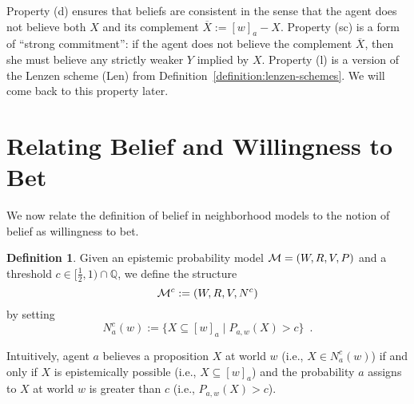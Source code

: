 \documentclass[12pt]{article}
\theoremstyle{definition}
\newtheorem{definition}[theorem]{Definition}
\newcommand{\Rat}{\mathbb{Q}}  %
\newcommand{\M}{{\cal M}}      %
\begin{document}
Property (d) ensures that beliefs are consistent in the sense that the
agent does not believe both $X$ and its complement
$\overline{X}:=[w]_a-X$.  Property (sc) is a form of ``strong
commitment'': if the agent does not believe the complement
$\overline{X}$, then she must believe any strictly weaker $Y$ implied
by $X$.  Property (l) is a version of the Lenzen scheme (Len) from
Definition~\ref{definition:lenzen-schemes}.  We will come back to this
property later.

\section{Relating Belief and Willingness to Bet}
\label{Section:BeliefBet}

We now relate the definition of belief in neighborhood models to the
notion of belief as willingness to bet.

\begin{definition}
  Given an epistemic probability model $\M = (W,R,V,P)$ and
  a threshold $c\in[\frac 12,1)\cap\Rat$, we define the structure
  \[
  \M^c := (W,R,V,N^c)
  \]
  by setting
  \[
  N^c_a(w) := \{X\subseteq[w]_a\mid P_{a,w}(X)>c\}\enspace.
  \]
\end{definition}

Intuitively, agent $a$ believes a proposition $X$ at world $w$ (i.e., $X\in N^c_a(w)$) if and
only if $X$ is epistemically possible (i.e., $X\subseteq[w]_a$) and
the probability $a$ assigns to $X$ at world $w$ is greater than $c$ (i.e.,
$P_{a,w}(X)>c$).
\end{document}
